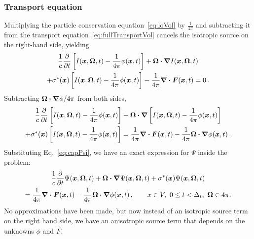 \subsubsection{Transport equation}
Multiplying the particle conservation equation~\eqref{eq:loVol} by
$\frac{1}{4\pi}$ and subtracting it from the transport
equation~\eqref{eq:fullTransportVol} cancels the isotropic source on the
right-hand side, yielding
\begin{multline*}
  \frac{1}{c} \frac{\partial }{\partial t}\left[ I(\bm{x}, \bm{\Omega}, t)
  - \frac{1}{4\pi} \phi(\bm{x}, t) \right]
    + \bm{\Omega}\bm{\cdot} \bm{\nabla} I(\bm{x}, \bm{\Omega}, t)
\\
    + \sigma^\ast(\bm{x}) \left[ I(\bm{x}, \bm{\Omega}, t)
  - \frac{1}{4\pi} \phi(\bm{x}, t) \right]
  - \frac{1}{4\pi} \bm{\nabla} \bm{\cdot}\bm{F}(\bm{x}, t)
= 0 \,.
\end{multline*}
Subtracting $\bm{\Omega}\bm{\cdot} \bm{\nabla} \phi/4\pi$ from both sides,
\begin{multline*}
  \frac{1}{c} \frac{\partial }{\partial t}\left[ I(\bm{x}, \bm{\Omega}, t)
  - \frac{1}{4\pi} \phi(\bm{x}, t) \right]
    + \bm{\Omega}\bm{\cdot} \bm{\nabla} \left[ I(\bm{x}, \bm{\Omega}, t)
  - \frac{1}{4\pi} \phi(\bm{x}, t) \right]
  \\  + \sigma^\ast(\bm{x}) \left[ I(\bm{x}, \bm{\Omega}, t)
  - \frac{1}{4\pi} \phi(\bm{x}, t) \right]
  = \frac{1}{4\pi} \bm{\nabla} \bm{\cdot}\bm{F}(\bm{x}, t) -
  \frac{1}{4\pi} \bm{\Omega}\bm{\cdot} \bm{\nabla} \phi(\bm{x}, t)\,.
\end{multline*}
Substituting Eq.~\eqref{eq:capPsi}, we have an exact expression for $\Psi$
inside the problem:
\begin{multline} \label{eq:capPsiVol}
  \frac{1}{c} \frac{\partial }{\partial t}\Psi(\bm{x}, \bm{\Omega}, t)
    + \bm{\Omega}\bm{\cdot} \bm{\nabla} \Psi(\bm{x}, \bm{\Omega}, t)
    + \sigma^\ast(\bm{x}) \Psi(\bm{x}, \bm{\Omega}, t)
  \\
  = \frac{1}{4\pi} \bm{\nabla} \bm{\cdot}\bm{F}(\bm{x}, t) -
  \frac{1}{4\pi} \bm{\Omega}\bm{\cdot} \bm{\nabla} \phi(\bm{x}, t)\,,
  \qquad
x \in V,\  0 \le t < \Delta_t, \ \bm{\Omega} \in 4\pi.
\end{multline}
No approximations have been made, but now instead of an isotropic source term
on the right hand side, we have an anisotropic source term that depends on the
unknowns $\phi$ and $\vec{F}$.

